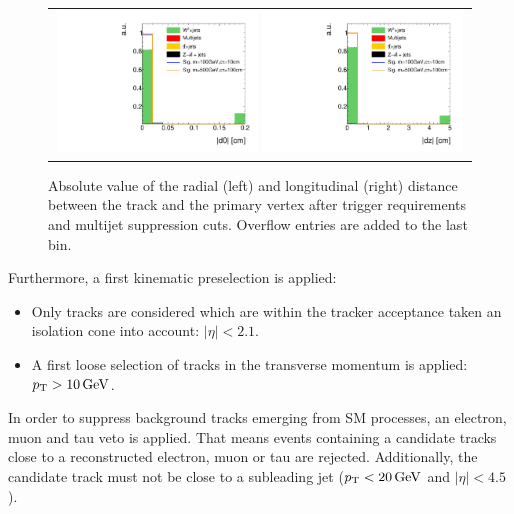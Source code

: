 \begin{figure}[!t]
  \centering 
  \begin{tabular}{c}
    \includegraphics[width=0.49\textwidth]{figures/analysis/AnalysisSelection/chiTracksQCDsupressionTrigger_2Signals_FullBkg/htrackd0_lin.pdf}
    \includegraphics[width=0.49\textwidth]{figures/analysis/AnalysisSelection/chiTracksQCDsupressionTrigger_2Signals_FullBkg/htrackdz_lin.pdf}
  \end{tabular}
  \caption{Absolute value of the radial (left) and longitudinal (right) distance between the track and the primary vertex after trigger requirements and multijet suppression cuts. 
           Overflow entries are added to the last bin.}
  \label{fig:d0_dz}
\end{figure}

Furthermore, a first kinematic preselection is applied:
\begin{itemize}
\renewcommand{\labelitemi}{\footnotesize{\ding{118}}}
\item Only tracks are considered which are within the tracker acceptance taken an isolation cone into account: $|\eta|<2.1$.
\item A first loose selection of tracks in the transverse momentum is applied: \mbox{$p_{\text{T}}>10\,\text{Ge}\kern-0.06667em\text{V}$}.
\end{itemize}
In order to suppress background tracks emerging from SM processes, an electron, muon and tau veto is applied.
That means events containing a candidate tracks close to a reconstructed electron, muon or tau are rejected.
Additionally, the candidate track must not be close to a subleading jet ($p_{\text{T}}<20\,\text{Ge}\kern-0.06667em\text{V}$ and $|\eta|<4.5$).


